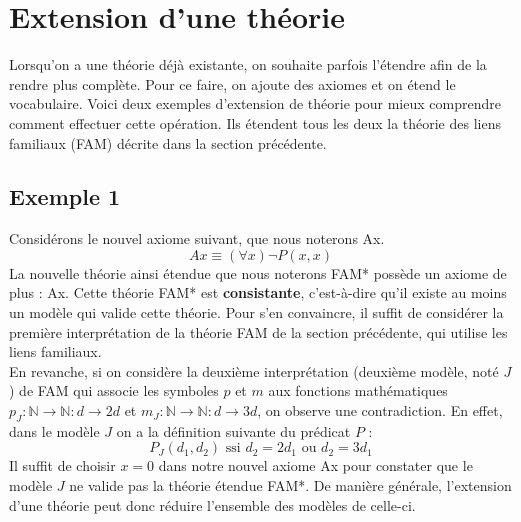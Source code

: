 \section{Extension d'une théorie}
Lorsqu'on a une théorie déjà existante, on souhaite parfois l'étendre afin de la rendre plus complète. Pour ce faire, on ajoute des axiomes et on étend le vocabulaire. Voici deux exemples d'extension de théorie pour mieux comprendre comment effectuer cette opération. Ils étendent tous les deux la théorie des liens familiaux (FAM) décrite dans la section précédente.

\subsection*{Exemple 1}
Considérons le nouvel axiome suivant, que nous noterons Ax.
$$ Ax \equiv (\forall x) \neg P(x,x) $$
La nouvelle théorie ainsi étendue que nous noterons FAM* possède un axiome de plus : Ax. Cette théorie FAM* est \textbf{consistante}, c'est-à-dire qu'il existe au moins un modèle qui valide cette théorie. Pour s'en convaincre, il suffit de considérer la première interprétation de la théorie FAM de la section précédente, qui utilise les liens familiaux. \\

En revanche, si on considère la deuxième interprétation (deuxième modèle, noté $J$) de FAM qui associe les symboles $p$ et $m$ aux fonctions mathématiques $p_J : \mathbb{N} \rightarrow \mathbb{N} : d \rightarrow 2d$ et $m_J : \mathbb{N} \rightarrow \mathbb{N} : d \rightarrow 3d$, on observe une contradiction. En effet, dans le modèle $J$ on a la définition suivante du prédicat $P$ :
$$ P_J(d_1, d_2) \textrm{ ssi } d_2 = 2d_1 \textrm{ ou } d_2 = 3d_1$$
Il suffit de choisir $x=0$ dans notre nouvel axiome Ax pour constater que le modèle $J$ ne valide pas la théorie étendue FAM*. De manière générale, l'extension d'une théorie peut donc réduire l'ensemble des modèles de celle-ci.

